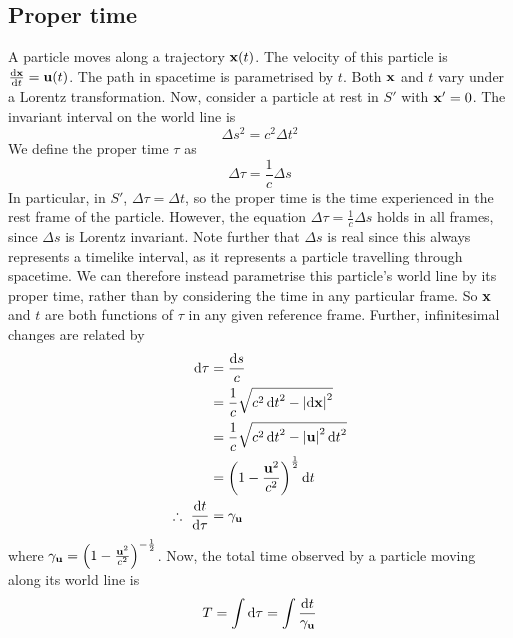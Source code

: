 \subsection{Proper time}
A particle moves along a trajectory \(\vb x(t)\).
The velocity of this particle is \(\dv{\vb x}{t} = \vb u(t)\).
The path in spacetime is parametrised by \(t\).
Both \(\vb x\) and \(t\) vary under a Lorentz transformation.
Now, consider a particle at rest in \(S'\) with \(\vb x' = 0\).
The invariant interval on the world line is
\[
	\Delta s^2 = c^2 \Delta t^2
\]
We define the proper time \(\tau\) as
\[
	\Delta \tau = \frac{1}{c}\Delta s
\]
In particular, in \(S'\), \(\Delta\tau = \Delta t\), so the proper time is the time experienced in the rest frame of the particle.
However, the equation \(\Delta \tau = \frac{1}{c}\Delta s\) holds in all frames, since \(\Delta s\) is Lorentz invariant.
Note further that \(\Delta s\) is real since this always represents a timelike interval, as it represents a particle travelling through spacetime.
We can therefore instead parametrise this particle's world line by its proper time, rather than by considering the time in any particular frame.
So \(\vb x\) and \(t\) are both functions of \(\tau\) in any given reference frame.
Further, infinitesimal changes are related by
\begin{align*}
	\dd{\tau}               & = \frac{\dd{s}}{c}                                       \\
	                        & = \frac{1}{c}\sqrt{c^2\dd{t}^2 - \abs{\dd{\vb x}}^2}     \\
	                        & = \frac{1}{c}\sqrt{c^2\dd{t}^2 - \abs{\vb u}^2 \dd{t}^2} \\
	                        & = \qty(1 - \frac{\vb u^2}{c^2})^{\frac{1}{2}}\dd{t}      \\
	\therefore\ \dv{t}{\tau} & = \gamma_{\vb u}
\end{align*}
where \(\gamma_{\vb u} = \qty(1 - \frac{\vb u^2}{c^2})^{-\frac{1}{2}}\).
Now, the total time observed by a particle moving along its world line is
\[
	T = \int \dd{\tau} = \int \frac{\dd{t}}{\gamma_{\vb u}}
\]

